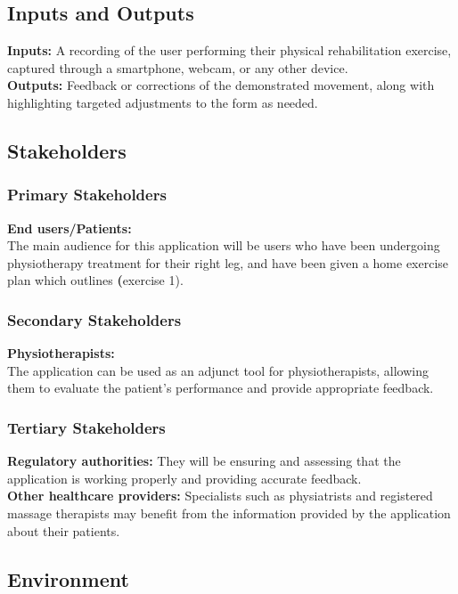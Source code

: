 \documentclass{article}
\begin{document}
\subsection{Inputs and Outputs}

\textbf{Inputs:} A recording of the user performing their physical rehabilitation exercise, captured through a smartphone, webcam, or any other device. \\
\textbf{Outputs:} Feedback or corrections of the demonstrated movement, along with highlighting targeted adjustments to the form as needed. 

\subsection{Stakeholders}


  \subsubsection{Primary Stakeholders}
    \textbf{End users/Patients:} \\
      The main audience for this application will be users who have been undergoing physiotherapy treatment for their right leg, and have been given a home exercise plan which outlines \textbf(exercise 1). \\    
     
  \subsubsection{Secondary Stakeholders}
    \textbf{Physiotherapists:} \\
      The application can be used as an adjunct tool for physiotherapists, allowing them to evaluate the patient's performance and provide appropriate feedback. 
      
  \subsubsection{Tertiary Stakeholders}
    \textbf{Regulatory authorities:}
      They will be ensuring and assessing that the application is working properly and providing accurate feedback. \\
     \textbf{Other healthcare providers:}
       Specialists such as physiatrists and registered massage therapists may benefit from the information provided by the application about their patients. 

\subsection{Environment}
\end{document}
